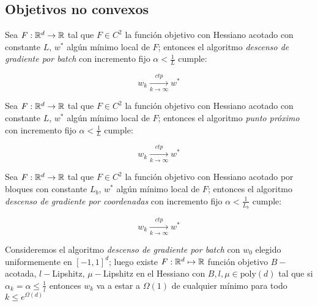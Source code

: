 \subsection{Objetivos no convexos}

\begin{theorem}
	Sea $F: {\mathbb{R}}^d \rightarrow {\mathbb{R}}$ tal que $F \in C^2$ la funci\'on objetivo con Hessiano acotado con constante $L$, $w^*$ alg\'un m\'inimo local de $F$; entonces el algoritmo \textit{descenso de gradiente por batch} con incremento fijo $\alpha < \frac{1}{L}$ cumple:
	
	\begin{equation*}
		w_k \xrightarrow[k \rightarrow \infty]{ctp} w^*
	\end{equation*}
	
\end{theorem}

\begin{theorem}
	Sea $F: {\mathbb{R}}^d \rightarrow {\mathbb{R}}$ tal que $F \in C^2$ la funci\'on objetivo con Hessiano acotado con constante $L$, $w^*$ alg\'un m\'inimo local de $F$; entonces el algoritmo \textit{punto pr\'oximo } con incremento fijo $\alpha < \frac{1}{L}$ cumple:
	
	\begin{equation*}
	w_k \xrightarrow[k \rightarrow \infty]{ctp} w^*
	\end{equation*}
	
\end{theorem}

\begin{theorem}
	Sea $F: {\mathbb{R}}^d \rightarrow {\mathbb{R}}$ tal que $F \in C^2$  la funci\'on objetivo con Hessiano acotado por bloques con constante $L_b$, $w^*$ alg\'un m\'inimo local de $F$; entonces el algoritmo \textit{descenso de gradiente por coordenadas} con incremento fijo $\alpha < \frac{1}{L_b}$ cumple:
	
\begin{equation*}
w_k \xrightarrow[k \rightarrow \infty]{ctp} w^*
\end{equation*}
	
\end{theorem}

\begin{theorem}
	Consideremos el algoritmo \textit{descenso de gradiente por batch} con $w_0$ elegido uniformemente en $[-1,1]^d$; luego existe $F : {\mathbb{R}}^d \mapsto {\mathbb{R}}$ funci\'on objetivo $B-$acotada, $l-$Lipshitz, $\mu-$Lipshitz en el Hessiano con $B,l,\mu \in \text{poly}(d)$ tal que si $\alpha_k = \alpha \leq \frac{1}{l}$ entonces $w_k$ va a estar a $\Omega(1)$ de cualquier m\'inimo para todo $k \leq e^{\Omega(d)}$
\end{theorem}

